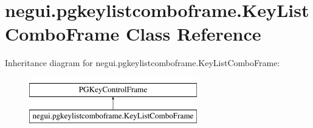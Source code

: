 \hypertarget{classnegui_1_1pgkeylistcomboframe_1_1KeyListComboFrame}{}\section{negui.\+pgkeylistcomboframe.\+Key\+List\+Combo\+Frame Class Reference}
\label{classnegui_1_1pgkeylistcomboframe_1_1KeyListComboFrame}
Inheritance diagram for negui.\+pgkeylistcomboframe.\+Key\+List\+Combo\+Frame\+:\begin{figure}[H]
\begin{center}
\leavevmode
\includegraphics[height=2.000000cm]{classnegui_1_1pgkeylistcomboframe_1_1KeyListComboFrame}
\end{center}
\end{figure}
